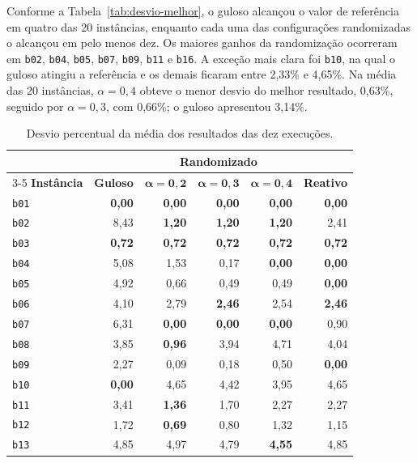 \documentclass[12pt]{article}
\begin{document}
Conforme a Tabela~\ref{tab:desvio-melhor}, o guloso alcançou o valor de referência em quatro das 20 instâncias, enquanto cada uma das configurações randomizadas o alcançou em pelo menos dez. Os maiores ganhos da randomização ocorreram em \texttt{b02}, \texttt{b04}, \texttt{b05}, \texttt{b07}, \texttt{b09}, \texttt{b11} e \texttt{b16}. A exceção mais clara foi \texttt{b10}, na qual o guloso atingiu a referência e os demais ficaram entre 2,33\% e 4,65\%. Na média das 20 instâncias, $\alpha=0{,}4$ obteve o menor desvio do melhor resultado, 0,63\%, seguido por $\alpha=0{,}3$, com 0,66\%; o guloso apresentou 3,14\%.

\begin{table}[htbp]
\centering
\caption{Desvio percentual da média dos resultados das dez execuções.}
\label{tab:desvio-media}
\scriptsize
\setlength{\tabcolsep}{4pt}
\begin{tabular}{lrrrrr}
\toprule
& & \multicolumn{3}{c}{\textbf{Randomizado}} &\\
\cmidrule(lr){3-5}
\textbf{Instância} & \textbf{Guloso} & $\boldsymbol{\alpha=0{,}2}$ & $\boldsymbol{\alpha=0{,}3}$ & $\boldsymbol{\alpha=0{,}4}$ & \textbf{Reativo}\\
\midrule
\texttt{b01} & \textbf{0,00} & \textbf{0,00} & \textbf{0,00} & \textbf{0,00} & \textbf{0,00}\\
\texttt{b02} & 8,43 & \textbf{1,20} & \textbf{1,20} & \textbf{1,20} & 2,41\\
\texttt{b03} & \textbf{0,72} & \textbf{0,72} & \textbf{0,72} & \textbf{0,72} & \textbf{0,72}\\
\texttt{b04} & 5,08 & 1,53 & 0,17 & \textbf{0,00} & \textbf{0,00}\\
\texttt{b05} & 4,92 & 0,66 & 0,49 & 0,49 & \textbf{0,00}\\
\texttt{b06} & 4,10 & 2,79 & \textbf{2,46} & 2,54 & \textbf{2,46}\\
\texttt{b07} & 6,31 & \textbf{0,00} & \textbf{0,00} & \textbf{0,00} & 0,90\\
\texttt{b08} & 3,85 & \textbf{0,96} & 3,94 & 4,71 & 4,04\\
\texttt{b09} & 2,27 & 0,09 & 0,18 & 0,50 & \textbf{0,00}\\
\texttt{b10} & \textbf{0,00} & 4,65 & 4,42 & 3,95 & 4,65\\
\texttt{b11} & 3,41 & \textbf{1,36} & 1,70 & 2,27 & 2,27\\
\texttt{b12} & 1,72 & \textbf{0,69} & 0,80 & 1,32 & 1,15\\
\texttt{b13} & 4,85 & 4,97 & 4,79 & \textbf{4,55} & 4,85\\

\end{tabular}
\end{table}
\end{document}
